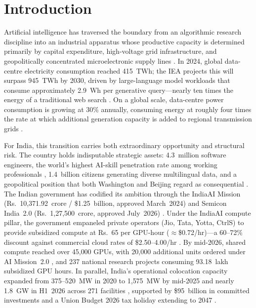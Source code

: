 \documentclass[conference]{IEEEtran}
\begin{document}
\section{Introduction}

Artificial intelligence has traversed the boundary from an algorithmic research discipline into an industrial apparatus whose productive capacity is determined primarily by capital expenditure, high-voltage grid infrastructure, and geopolitically concentrated microelectronic supply lines \cite{akimitsu2026chokepoints}. In 2024, global data-centre electricity consumption reached 415~TWh; the IEA projects this will surpass 945~TWh by 2030, driven by large-language model workloads that consume approximately 2.9~Wh per generative query---nearly ten times the energy of a traditional web search \cite{iea2024aienergy}. On a global scale, data-centre power consumption is growing at 30\% annually, consuming energy at roughly four times the rate at which additional generation capacity is added to regional transmission grids \cite{swaminathan2026vertical}.

For India, this transition carries both extraordinary opportunity and structural risk. The country holds indisputable strategic assets: 4.3~million software engineers, the world's highest AI-skill penetration rate among working professionals \cite{linkedin2025aiindex}, 1.4~billion citizens generating diverse multilingual data, and a geopolitical position that both Washington and Beijing regard as consequential \cite{stimson2026sovereign}. The Indian government has codified its ambition through the IndiaAI Mission (Rs.~10{,}371.92~crore / \$1.25~billion, approved March~2024) \cite{meity2024indiaai} and Semicon India~2.0 (Rs.~1{,}27{,}500~crore, approved July~2026) \cite{ism2025semicon,pib2026semicon2}. Under the IndiaAI compute pillar, the government empaneled private operators (Jio, Tata, Yotta, CtrlS) to provide subsidized compute at Rs.~65 per GPU-hour ($\approx$\$0.72/hr)---a 60--72\% discount against commercial cloud rates of \$2.50--4.00/hr \cite{sbicap2025datacentre,eetimes2026aimission}. By mid-2026, shared compute reached over 45{,}000 GPUs, with 20{,}000 additional units ordered under AI Mission~2.0 \cite{eetimes2026aimission}, and 237 national research projects consuming 93.18~lakh subsidized GPU hours. In parallel, India's operational colocation capacity expanded from 375--520~MW in 2020 to 1{,}575~MW by mid-2025 and nearly 1.8~GW in H1~2026 across 271 facilities \cite{cushman2026h1,ceew2026datacentre}, supported by \$95~billion in committed investments and a Union Budget 2026 tax holiday extending to 2047 \cite{ceew2026datacentre}.
\end{document}

